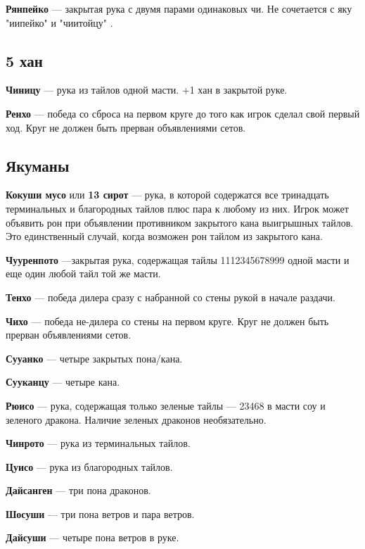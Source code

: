 \textbf{Рянпейко} --- закрытая рука с двумя парами одинаковых чи. Не сочетается с яку "иипейко"  и "чиитойцу" .


\subsection{5 хан}

\textbf{Чиницу} --- рука  из тайлов  одной масти. +1 хан в закрытой руке.

\textbf{Ренхо} --- победа со сброса на первом круге до того как игрок сделал свой первый ход. Круг не должен быть прерван объявлениями сетов. 

\subsection{Якуманы}

\textbf{Кокуши мусо} или \textbf{13 сирот} --- рука, в которой содержатся все тринадцать терминальных и благородных тайлов плюс пара к любому из них. Игрок может объявить рон при объявлении противником закрытого кана выигрышных тайлов. Это единственный случай, когда возможен рон тайлом из закрытого кана.

\textbf{Чууренпото} ---закрытая рука, содержащая тайлы 1112345678999 одной масти и еще один любой тайл той же масти.

 \hfill {}

\textbf{Тенхо} --- победа дилера сразу с набранной со стены рукой в начале раздачи. 

\textbf{Чихо} --- победа не-дилера со стены на первом круге. Круг не должен быть прерван объявлениями сетов.

\textbf{Сууанко} --- четыре закрытых пона/кана.

\textbf{Сууканцу} --- четыре кана.

\textbf{Рюисо} --- рука, содержащая только зеленые тайлы --- 23468 в масти соу и зеленого дракона. Наличие зеленых драконов необязательно.

 \textbf{Чинрото} --- рука из терминальных тайлов.
 
 \textbf{Цуисо} --- рука из благородных тайлов.
 
 \textbf{Дайсанген} --- три пона драконов.

\textbf{Шосуши} --- три пона ветров и пара ветров.

\textbf{Дайсуши} --- четыре пона ветров в руке.






